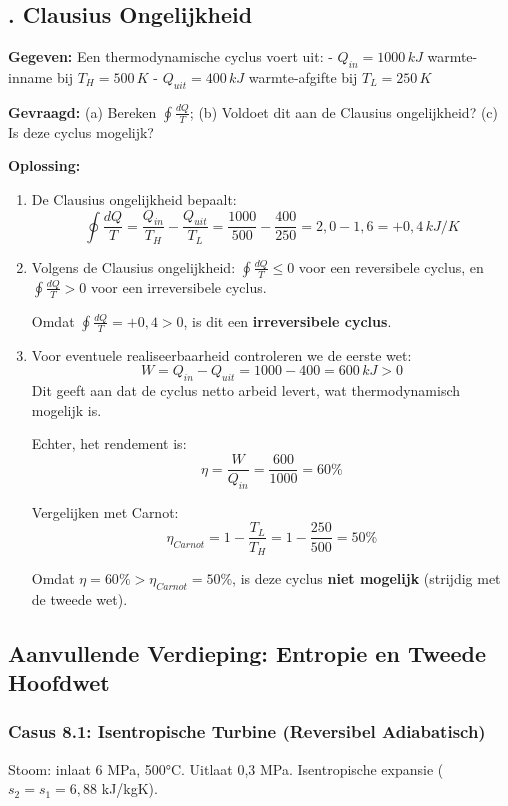 \documentclass[a4paper,11pt,twoside]{report}
\newcounter{opgave}[section]
\newcommand{\opgave}[1]{%
    \refstepcounter{opgave}%
    \subsection*{\textbf{\arabic{opgave}.} #1}%
}
\begin{document}
\opgave{Clausius Ongelijkheid}
\textbf{Gegeven:}
Een thermodynamische cyclus voert uit:
- $Q_{in} = 1000 \, kJ$ warmte-inname bij $T_H = 500 \, K$
- $Q_{uit} = 400 \, kJ$ warmte-afgifte bij $T_L = 250 \, K$

\textbf{Gevraagd:}
(a) Bereken $\oint \frac{dQ}{T}$; (b) Voldoet dit aan de Clausius ongelijkheid? (c) Is deze cyclus mogelijk?

\textbf{Oplossing:}
\begin{enumerate}
    \item De Clausius ongelijkheid bepaalt:
    \[ \oint \frac{dQ}{T} = \frac{Q_{in}}{T_H} - \frac{Q_{uit}}{T_L} = \frac{1000}{500} - \frac{400}{250} = 2,0 - 1,6 = +0,4 \, kJ/K \]
    
    \item Volgens de Clausius ongelijkheid: $\oint \frac{dQ}{T} \leq 0$ voor een reversibele cyclus, en $\oint \frac{dQ}{T} > 0$ voor een irreversibele cyclus.
    
    Omdat $\oint \frac{dQ}{T} = +0,4 > 0$, is dit een \textbf{irreversibele cyclus}.
    
    \item Voor eventuele realiseerbaarheid controleren we de eerste wet:
    \[ W = Q_{in} - Q_{uit} = 1000 - 400 = 600 \, kJ > 0 \]
    Dit geeft aan dat de cyclus netto arbeid levert, wat thermodynamisch mogelijk is.
    
    Echter, het rendement is:
    \[ \eta = \frac{W}{Q_{in}} = \frac{600}{1000} = 60\% \]
    
    Vergelijken met Carnot:
    \[ \eta_{Carnot} = 1 - \frac{T_L}{T_H} = 1 - \frac{250}{500} = 50\% \]
    
    Omdat $\eta = 60\% > \eta_{Carnot} = 50\%$, is deze cyclus \textbf{niet mogelijk} (strijdig met de tweede wet).
\end{enumerate}

\subsection*{Aanvullende Verdieping: Entropie en Tweede Hoofdwet}

\subsubsection*{Casus 8.1: Isentropische Turbine (Reversibel Adiabatisch)}
Stoom: inlaat 6 MPa, 500°C. Uitlaat 0,3 MPa. Isentropische expansie ($s_2 = s_1 = 6{,}88$ kJ/kgK).
\end{document}

